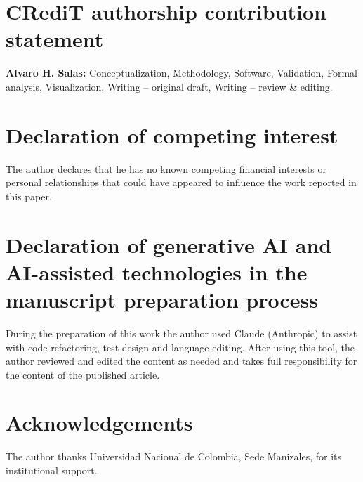 \documentclass[preprint,12pt]{elsarticle}
\begin{document}
\section*{CRediT authorship contribution statement}
\textbf{Alvaro H. Salas:} Conceptualization, Methodology, Software, Validation,
Formal analysis, Visualization, Writing -- original draft, Writing -- review \& editing.

\section*{Declaration of competing interest}
The author declares that he has no known competing financial interests or
personal relationships that could have appeared to influence the work reported
in this paper.

\section*{Declaration of generative AI and AI-assisted technologies in the manuscript preparation process}
During the preparation of this work the author used Claude (Anthropic) to assist
with code refactoring, test design and language editing. After using this tool,
the author reviewed and edited the content as needed and takes full
responsibility for the content of the published article.

\section*{Acknowledgements}
The author thanks Universidad Nacional de Colombia, Sede Manizales, for its
institutional support.
\end{document}
